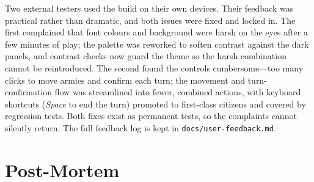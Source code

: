 \documentclass[12pt,a4paper]{article}
\begin{document}
Two external testers used the build on their own devices. Their feedback was
practical rather than dramatic, and both issues were fixed and locked in. The
first complained that font colours and background were harsh on the eyes
after a few minutes of play; the palette was reworked to soften contrast
against the dark panels, and contrast checks now guard the theme so the harsh
combination cannot be reintroduced. The second found the controls
cumbersome---too many clicks to move armies and confirm each turn; the
movement and turn-confirmation flow was streamlined into fewer, combined
actions, with keyboard shortcuts (\emph{Space} to end the turn) promoted to
first-class citizens and covered by regression tests. Both fixes exist as
permanent tests, so the complaints cannot silently return. The full feedback
log is kept in \texttt{docs/user-feedback.md}.

\section{Post-Mortem}
\label{sec:postmortem}
\end{document}
